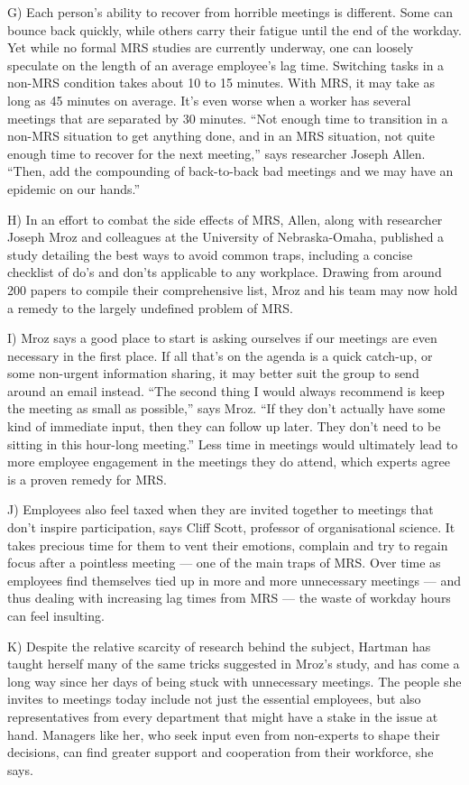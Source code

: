 \documentclass[UTF8,11pt]{ctexart}
\begin{document}
G) Each person’s ability to recover from horrible meetings is different. Some can bounce back quickly, while others carry their fatigue until the end of the workday. Yet while no formal MRS studies are currently underway, one can loosely speculate on the length of an average employee’s lag time. Switching tasks in a non-MRS condition takes about 10 to 15 minutes. With MRS, it may take as long as 45 minutes on average. It’s even worse when a worker has several meetings that are separated by 30 minutes. “Not enough time to transition in a non-MRS situation to get anything done, and in an MRS situation, not quite enough time to recover for the next meeting,” says researcher Joseph Allen. “Then, add the compounding of back-to-back bad meetings and we may have an epidemic on our hands.”


H) In an effort to combat the side effects of MRS, Allen, along with researcher Joseph Mroz and colleagues at the University of Nebraska-Omaha, published a study detailing the best ways to avoid common traps, including a concise checklist of do’s and don’ts applicable to any workplace. Drawing from around 200 papers to compile their comprehensive list, Mroz and his team may now hold a remedy to the largely undefined problem of MRS.


I) Mroz says a good place to start is asking ourselves if our meetings are even necessary in the first place. If all that’s on the agenda is a quick catch-up, or some non-urgent information sharing, it may better suit the group to send around an email instead. “The second thing I would always recommend is keep the meeting as small as possible,” says Mroz. “If they don’t actually have some kind of immediate input, then they can follow up later. They don’t need to be sitting in this hour-long meeting.” Less time in meetings would ultimately lead to more employee engagement in the meetings they do attend, which experts agree is a proven remedy for MRS.


J) Employees also feel taxed when they are invited together to meetings that don’t inspire participation, says Cliff Scott, professor of organisational science. It takes precious time for them to vent their emotions, complain and try to regain focus after a pointless meeting — one of the main traps of MRS. Over time as employees find themselves tied up in more and more unnecessary meetings — and thus dealing with increasing lag times from MRS — the waste of workday hours can feel insulting.


K) Despite the relative scarcity of research behind the subject, Hartman has taught herself many of the same tricks suggested in Mroz’s study, and has come a long way since her days of being stuck with unnecessary meetings. The people she invites to meetings today include not just the essential employees, but also representatives from every department that might have a stake in the issue at hand. Managers like her, who seek input even from non-experts to shape their decisions, can find greater support and cooperation from their workforce, she says.
\end{document}
